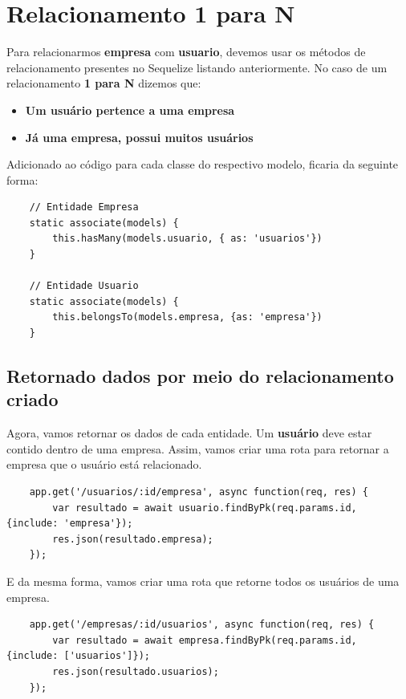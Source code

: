 \section{Relacionamento 1 para N}

Para relacionarmos \textbf{empresa} com \textbf{usuario}, devemos usar os métodos de relacionamento presentes no Sequelize listando anteriormente. No caso de um relacionamento \textbf{1 para N} dizemos que:

\begin{itemize}
	\item \textbf{Um usuário pertence a uma empresa}
	\item \textbf{Já uma empresa, possui muitos usuários}
\end{itemize}

Adicionado ao código para cada classe do respectivo modelo, ficaria da seguinte forma:

\begin{verbatim}
	// Entidade Empresa
	static associate(models) {
		this.hasMany(models.usuario, { as: 'usuarios'})
	}

	// Entidade Usuario
	static associate(models) {
		this.belongsTo(models.empresa, {as: 'empresa'})
	}
\end{verbatim}

\subsection{Retornado dados por meio do relacionamento criado}

Agora, vamos retornar os dados de cada entidade. Um \textbf{usuário} deve estar contido dentro de uma empresa. Assim, vamos criar uma rota para retornar a empresa que o usuário está relacionado.

\begin{verbatim}
	app.get('/usuarios/:id/empresa', async function(req, res) {
		var resultado = await usuario.findByPk(req.params.id, {include: 'empresa'});
		res.json(resultado.empresa);
	});
\end{verbatim}

E da mesma forma, vamos criar uma rota que retorne todos os usuários de uma empresa.

\begin{verbatim}
	app.get('/empresas/:id/usuarios', async function(req, res) {
		var resultado = await empresa.findByPk(req.params.id, {include: ['usuarios']});
		res.json(resultado.usuarios);
	});
\end{verbatim}

